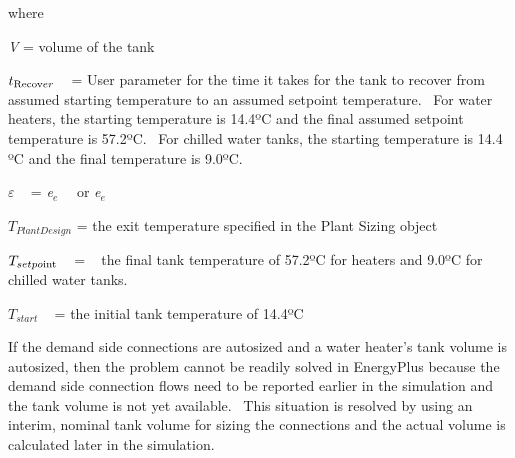 where

\emph{V} = volume of the tank

\({t_{{\mathop{\rm Re}\nolimits} {\mathop{\rm cov}} er}}\) ~ = User parameter for the time it takes for the tank to recover from assumed starting temperature to an assumed setpoint temperature.~ For water heaters, the starting temperature is 14.4ºC and the final assumed setpoint temperature is 57.2ºC.~ For chilled water tanks, the starting temperature is 14.4 ºC and the final temperature is 9.0ºC.

\(\varepsilon\) ~ = \emph{e\(_{e}\)} ~~or \emph{e\(_{e}\)}

\({T_{PlantDesign}}\) = the exit temperature specified in the Plant Sizing object

\({T_{setpo{\mathop{\rm int}} }}\) ~ = ~ the final tank temperature of 57.2ºC for heaters and 9.0ºC for chilled water tanks.

\({T_{start}}\) ~ = the initial tank temperature of 14.4ºC

If the demand side connections are autosized and a water heater's tank volume is autosized, then the problem cannot be readily solved in EnergyPlus because the demand side connection flows need to be reported earlier in the simulation and the tank volume is not yet available.~ This situation is resolved by using an interim, nominal tank volume for sizing the connections and the actual volume is calculated later in the simulation.
